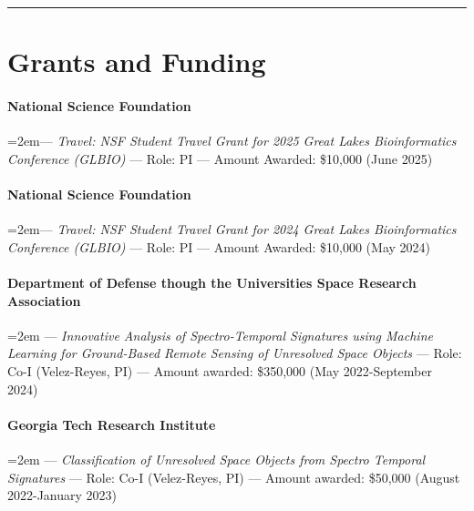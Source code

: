 \documentclass[10pt,letterpaper]{article}
\newcommand{\cvsection}[1]{%
    \par\vspace{10pt}%
  \noindent\rule{\linewidth}{0.4pt}\par
  \vspace{-5.5ex}%
  \section*{#1}%
}
\begin{document}
\cvsection{Grants and Funding}
\paragraph{National Science Foundation}  \hangindent=2em--- 
	\textit{Travel: NSF Student Travel Grant for 2025 Great Lakes Bioinformatics Conference (GLBIO)} ---
	Role: PI --- Amount Awarded: \$10,000 (June 2025)
	
\paragraph{National Science Foundation}  \hangindent=2em--- 
	\textit{Travel: NSF Student Travel Grant for 2024 Great Lakes Bioinformatics Conference (GLBIO)} ---
	Role: PI --- Amount Awarded: \$10,000 (May 2024)

\paragraph{Department of Defense though the Universities Space Research Association}   \hangindent=2em --- 
	\textit{Innovative Analysis of Spectro-Temporal Signatures using Machine Learning for Ground-Based Remote Sensing of Unresolved Space Objects} --- 
	Role: Co-I (Velez-Reyes, PI) --- Amount awarded: \$350,000 (May 2022-September 2024)

\paragraph{Georgia Tech Research Institute}  \hangindent=2em  --- 
	\textit{Classification of Unresolved Space Objects from Spectro Temporal Signatures} ---
	Role: Co-I (Velez-Reyes, PI) --- Amount awarded: \$50,000 (August 2022-January 2023)
\end{document}
